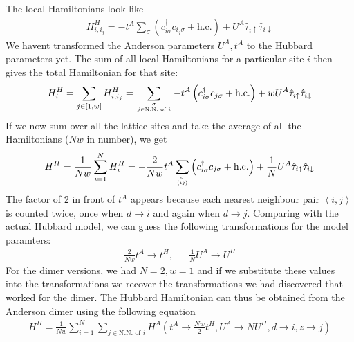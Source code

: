 \documentclass{article}
\numberwithin{equation}{section}
\begin{document}
The local Hamiltonians look like
\begin{equation}\begin{aligned}
	H^H_{i,i_j} = -t^A\sum_{\sigma}\left(c^\dagger_{i\sigma}c_{i_j\sigma} + \text{h.c.}\right) + U^A\hat \tau_{i \uparrow}\hat \tau_{i \downarrow}
\end{aligned}\end{equation}
We havent transformed the Anderson parameters \(U^A, t^A\) to the Hubbard parameters yet. The sum of all local Hamiltonians for a particular site \(i\) then gives the total Hamiltonian for that site:
\begin{equation}\begin{aligned}
	H^H_{i} = \sum_{j\in\left[1,w\right]}H^H_{i,i_j} = \sum_{\sigma\atop{j \in \text{N.N. of }i}}-t^A\left(c^\dagger_{i\sigma}c_{j\sigma} + \text{h.c.}\right) + w U^A\hat \tau_{i \uparrow}\hat \tau_{i \downarrow}
\end{aligned}\end{equation}
If we now sum over all the lattice sites and take the average of all the Hamiltonians (\(Nw\) in number), we get
\begin{equation}\begin{aligned}
	H^H = \frac{1}{Nw}\sum_{i=1}^N H^H_{i} = -\frac{2}{Nw}t^A\sum_{\sigma\atop{\left<ij \right>}}\left(c^\dagger_{i\sigma}c_{j\sigma} + \text{h.c.}\right) + \frac{1}{N}U^A\hat \tau_{i \uparrow}\hat \tau_{i \downarrow}
\end{aligned}\end{equation}
The factor of 2 in front of \(t^A\) appears because each nearest neighbour pair \(\left<i,j \right>\) is counted twice, once when \(d\to i\) and again when \(d \to j\). Comparing with the actual Hubbard model, we can guess the following transformations for the model paramters:
\begin{equation}\begin{aligned}
	\frac{2}{Nw}t^A \to t^H, && \frac{1}{N}U^A \to U^H
\end{aligned}\end{equation}
For the dimer versions, we had \(N=2, w=1\) and if we substitute these values into the transformations we recover the transformations we had discovered that worked for the dimer. The Hubbard Hamiltonian can thus be obtained from the Anderson dimer using the following equation
\begin{equation}\begin{aligned}
	H^H = \frac{1}{Nw}\sum_{i=1}^N\sum_{j\in\text{N.N. of }i}H^A\left(t^A \to \frac{Nw}{2}t^H, U^A \to N U^H, d \to i, z \to j\right)
\end{aligned}\end{equation}










\end{document}
